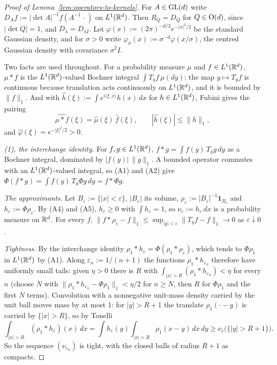 \begin{proof}[Proof of Lemma~\ref{lem:operators-to-kernels}]
For $A \in \mathrm{GL}(d)$ write $D_Af := |\det A|^{-1}f(A^{-1}\,\cdot)$ on $L^1(\mathbb{R}^d)$. Then
$R_Q = D_Q$ for $Q \in \mathrm{O}(d)$, since $|\det Q| = 1$, and $D_\lambda = D_{\lambda I}$. Let
$\varphi(x) := (2\pi)^{-d/2}e^{-|x|^2/2}$ be the standard Gaussian density, and for $\sigma > 0$
write $\varphi_\sigma(x) := \sigma^{-d}\varphi(x/\sigma)$, the centred Gaussian density with
covariance $\sigma^2I$.

Two facts are used throughout. For a probability measure $\mu$ and $f \in L^1(\mathbb{R}^d)$, $\mu * f$
is the $L^1(\mathbb{R}^d)$-valued Bochner integral $\int T_yf\,\mu(dy)$: the map $y \mapsto T_yf$ is
continuous because translation acts continuously on $L^1(\mathbb{R}^d)$, and it is bounded by
$\|f\|_1$. And with $\widehat h(\xi) := \int e^{i\langle\xi,x\rangle}h(x)\,dx$ for
$h \in L^1(\mathbb{R}^d)$, Fubini gives the pairing
\[
  \widehat{\mu * f}(\xi) = \widehat\mu(\xi)\,\widehat f(\xi),
  \qquad |\widehat h(\xi)| \le \|h\|_1 ,
\]
and $\widehat\varphi(\xi) = e^{-|\xi|^2/2} > 0$.

\emph{(1), the interchange identity.} For $f, g \in L^1(\mathbb{R}^d)$, $f * g = \int f(y)\,T_yg\,dy$ as
a Bochner integral, dominated by $|f(y)|\,\|g\|_1$. A bounded operator commutes with an
$L^1(\mathbb{R}^d)$-valued integral, so (A1) and (A2) give $\Phi(f * g) = \int f(y)\,T_y\Phi g\,dy
= f * \Phi g$.

\emph{The approximants.} Let $B_\varepsilon := \{|x| < \varepsilon\}$, $|B_\varepsilon|$ its
volume, $\rho_\varepsilon := |B_\varepsilon|^{-1}\mathbf 1_{B_\varepsilon}$ and
$h_\varepsilon := \Phi\rho_\varepsilon$. By (A4) and (A5), $h_\varepsilon \ge 0$ with
$\int h_\varepsilon = 1$, so $\nu_\varepsilon := h_\varepsilon\,dx$ is a probability measure on
$\mathbb{R}^d$. For every $f$, $\|f * \rho_\varepsilon - f\|_1 \le \sup_{|y| < \varepsilon}
\|T_yf - f\|_1 \to 0$ as $\varepsilon \downarrow 0$.

\emph{Tightness.} By the interchange identity $\rho_1 * h_\varepsilon = \Phi(\rho_1 *
\rho_\varepsilon)$, which tends to $\Phi\rho_1$ in $L^1(\mathbb{R}^d)$ by (A1). Along
$\varepsilon_n := 1/(n+1)$ the functions $\rho_1 * h_{\varepsilon_n}$ therefore have uniformly
small tails: given $\eta > 0$ there is $R$ with $\int_{|x| > R}(\rho_1 * h_{\varepsilon_n}) < \eta$
for every $n$ (choose $N$ with $\|\rho_1 * h_{\varepsilon_n} - \Phi\rho_1\|_1 < \eta/2$ for
$n \ge N$, then $R$ for $\Phi\rho_1$ and the first $N$ terms). Convolution with a nonnegative
unit-mass density carried by the unit ball moves mass by at most $1$: for $|y| > R + 1$ the
translate $\rho_1(\cdot - y)$ is carried by $\{|x| > R\}$, so by Tonelli
\[
  \int_{|x| > R}(\rho_1 * h_\varepsilon)(x)\,dx
  = \int h_\varepsilon(y)\int_{|x| > R}\rho_1(x - y)\,dx\,dy
  \ge \nu_\varepsilon\bigl(\{|y| > R + 1\}\bigr) .
\]
So the sequence $(\nu_{\varepsilon_n})$ is tight, with the closed balls of radius $R + 1$ as
compacts.


\end{proof}
